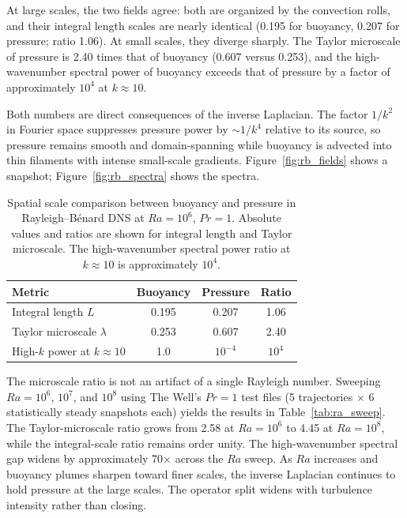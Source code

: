 \documentclass[11pt]{article}
\begin{document}
At large scales, the two fields agree: both are organized by the convection rolls, and their integral length scales are nearly identical (0.195 for buoyancy, 0.207 for pressure; ratio 1.06). At small scales, they diverge sharply. The Taylor microscale of pressure is 2.40 times that of buoyancy (0.607 versus 0.253), and the high-wavenumber spectral power of buoyancy exceeds that of pressure by a factor of approximately $10^4$ at $k \approx 10$.

Both numbers are direct consequences of the inverse Laplacian. The factor $1/k^2$ in Fourier space suppresses pressure power by $\sim 1/k^4$ relative to its source, so pressure remains smooth and domain-spanning while buoyancy is advected into thin filaments with intense small-scale gradients. Figure~\ref{fig:rb_fields} shows a snapshot; Figure~\ref{fig:rb_spectra} shows the spectra.

\begin{table}[t]
\centering
\caption{Spatial scale comparison between buoyancy and pressure in Rayleigh--B\'enard DNS at $Ra = 10^6$, $Pr = 1$. Absolute values and ratios are shown for integral length and Taylor microscale. The high-wavenumber spectral power ratio at $k \approx 10$ is approximately $10^4$.}
\label{tab:dns_scales}
\begin{tabular}{lccc}
\toprule
Metric & Buoyancy & Pressure & Ratio \\
\midrule
Integral length $L$ & 0.195 & 0.207 & 1.06 \\
Taylor microscale $\lambda$ & 0.253 & 0.607 & 2.40 \\
High-$k$ power at $k \approx 10$ & 1.0 & $10^{-4}$ & $10^4$ \\
\bottomrule
\end{tabular}
\end{table}

The microscale ratio is not an artifact of a single Rayleigh number. Sweeping $Ra = 10^6$, $10^7$, and $10^8$ using The Well's $Pr = 1$ test files (5 trajectories $\times$ 6 statistically steady snapshots each) yields the results in Table~\ref{tab:ra_sweep}. The Taylor-microscale ratio grows from 2.58 at $Ra = 10^6$ to 4.45 at $Ra = 10^8$, while the integral-scale ratio remains order unity. The high-wavenumber spectral gap widens by approximately 70× across the $Ra$ sweep. As $Ra$ increases and buoyancy plumes sharpen toward finer scales, the inverse Laplacian continues to hold pressure at the large scales. The operator split widens with turbulence intensity rather than closing.
\end{document}
